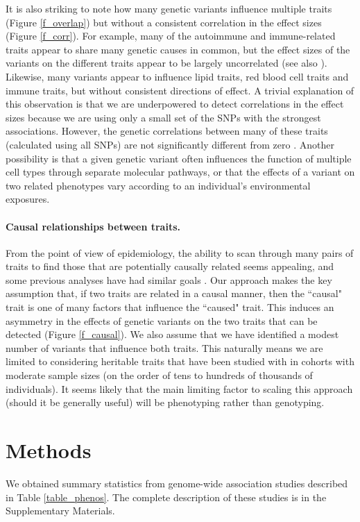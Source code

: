 \documentclass[11pt,titlepage]{article}
\begin{document}
It is also striking to note how many genetic variants influence multiple traits (Figure \ref{f_overlap}) but without a consistent correlation in the effect sizes (Figure \ref{f_corr}). For example, many of the autoimmune and immune-related traits appear to share many genetic causes in common, but the effect sizes of the variants on the different traits appear to be largely uncorrelated (see also \citet{Cotsapas:2011aa, bulik2015atlas}). Likewise, many variants appear to influence lipid traits, red blood cell traits and immune traits, but without consistent directions of effect. A trivial explanation of this observation is that we are underpowered to detect correlations in the effect sizes because we are using only a small set of the SNPs with the strongest associations. However, the genetic correlations between many of these traits (calculated using all SNPs) are not significantly different from zero \citep{bulik2015atlas}. Another possibility is that a given genetic variant often influences the function of multiple cell types through separate molecular pathways, or that the effects of a variant on two related phenotypes vary according to an individual's environmental exposures.

\paragraph{Causal relationships between traits.}
From the point of view of epidemiology, the ability to scan through many pairs of traits to find those that are potentially causally related seems appealing, and some previous analyses have had similar goals \citep{Evans:2013aa}. 
Our approach makes the key assumption that, if two traits are related in a causal manner, then the ``causal" trait is one of many factors that influence the ``caused" trait. 
This induces an asymmetry in the effects of genetic variants on the two traits that can be detected (Figure \ref{f_causal}). 
We also assume that we have identified a modest number of variants that influence both traits. 
This naturally means we are limited to considering heritable traits that have been studied with in cohorts with moderate sample sizes (on the order of tens to hundreds of thousands of individuals). 
It seems likely that the main limiting factor to scaling this approach (should it be generally useful) will be phenotyping rather than genotyping.

\section{Methods} \label{model_sec}
We obtained summary statistics from genome-wide association studies described in Table \ref{table_phenos}. The complete description of these studies is in the Supplementary Materials.
\end{document}
